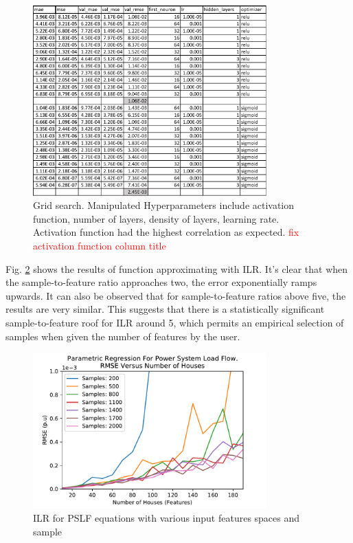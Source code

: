 \documentclass[conference]{IEEEtran}
\begin{document}
\begin{figure}[h]
	\centering
	\includegraphics[width=9cm]{gridsearch.pdf}
	\caption{Grid search. Manipulated Hyperparameters include activation function, number of layers, density of layers, learning rate. Activation function had the highest correlation as expected. \textcolor{red}{fix activation function column title}}
	\label{fig:gridsearch}
\end{figure}

Fig. \ref{fig:ilrresults} shows the results of function approximating with ILR. It's clear that when the sample-to-feature ratio approaches two, the error exponentially ramps upwards. It can also be observed that for sample-to-feature ratios above five, the results are very similar. This suggests that there is a statistically significant sample-to-feature roof for ILR around 5, which permits an empirical selection of samples when given the number of features by the user.

\begin{figure}[h]
	\centering
	\includegraphics[width=9cm]{ilrrmsevsfeatures_familyofcurves.pdf}
	\caption{ILR for PSLF equations with various input features spaces and sample}
	\label{fig:ilrresults}
\end{figure}
\end{document}
